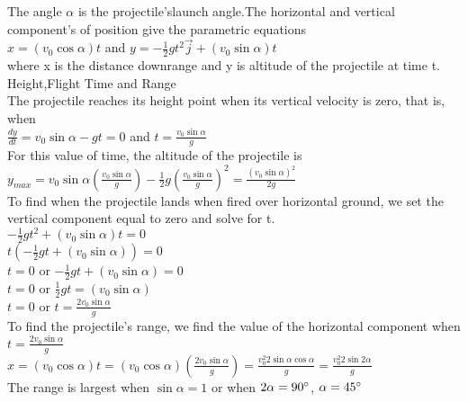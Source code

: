 \documentclass{report}
\begin{document}
		The angle $\alpha$ is the projectile'slaunch angle.The horizontal and vertical component's of position give the parametric equations \\
		\hspace*{10 em} $ x = (v_{0}\cos\alpha)t$ and $ y = -\frac{1}{2}gt^2\vec{j} + (v_{0}\sin\alpha)t $ \\
		where x is the distance downrange and y is altitude of the projectile at time t.
		Height,Flight Time and Range \\
		The projectile reaches its height point when its vertical velocity is zero, that is, when\\
		\hspace*{10 em} $\frac{dy}{dt} = v_{0}\sin\alpha - gt = 0$ and $t = \frac{v_{0}\sin\alpha}{g}$\\ 
		For this value of time, the altitude of the projectile is\\
		\hspace*{10 em}$ y_{max} = v_{0}\sin\alpha(\frac{v_{0}\sin\alpha}{g}) -\frac{1}{2}g(\frac{v_{0}\sin\alpha}{g})^2 = \frac{(v_{0}\sin\alpha)^2}{2g}$\\
		To find when the projectile lands when fired over horizontal ground, we set the vertical component equal to zero and solve for t.\\
		\hspace*{10 em}$ -\frac{1}{2}gt^2 + (v_{0}\sin\alpha)t = 0$\\
		\hspace*{10 em}$ t(-\frac{1}{2}gt + (v_{0}\sin\alpha)) = 0$\\
		\hspace*{10 em}$ t = 0$ or $-\frac{1}{2}gt + (v_{0}\sin\alpha) = 0 $\\
		\hspace*{10 em}$ t = 0$ or $\frac{1}{2}gt = (v_{0}\sin\alpha)$\\
		\hspace*{10 em}$ t = 0$ or $ t = \frac{2v_{0}\sin\alpha}{g}$\\
		To find the projectile's range, we find the value of the horizontal component when $t = \frac{2v_{0}\sin\alpha}{g}$\\
		\hspace*{6 em} $ x =(v_{0}\cos\alpha)t = (v_{0}\cos\alpha)(\frac{2v_{0}\sin\alpha}{g}) = \frac{v^2_{0}2\sin\alpha\cos\alpha}{g} = \frac{v^2_{0}2\sin2\alpha}{g} $\\
		The range is largest when $\sin\alpha = 1 $ or when $ 2\alpha = 90\degree$, $\alpha =45\degree$\\
\end{document}
